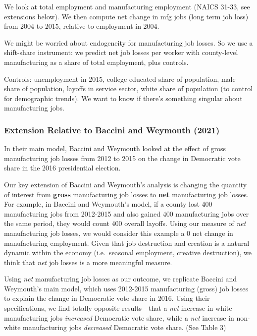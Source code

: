\documentclass[
  12pt,
]{article}
\begin{document}
We look at total employment and manufacturing employment (NAICS 31-33,
see extensions below). We then compute net change in mfg jobs (long term
job loss) from 2004 to 2015, relative to employment in 2004.

We might be worried about endogeneity for manufacturing job losses. So
we use a shift-share instrument: we predict net job losses per worker
with county-level manufacturing as a share of total employment, plus
controls.

Controls: unemployment in 2015, college educated share of population,
male share of population, layoffs in service sector, white share of
population (to control for demographic trends). We want to know if
there's something singular about manufacturing jobs.

\hypertarget{extension-relative-to-baccini-and-weymouth-2021}{%
\subsubsection{Extension Relative to Baccini and Weymouth
(2021)}\label{extension-relative-to-baccini-and-weymouth-2021}}

In their main model, Baccini and Weymouth looked at the effect of gross
manufacturing job losses from 2012 to 2015 on the change in Democratic
vote share in the 2016 presidential election.

Our key extension of Baccini and Weymouth's analysis is changing the
quantity of interest from \textbf{gross} manufacturing job losses to
\textbf{net} manufacturing job losses. For example, in Baccini and
Weymouth's model, if a county lost 400 manufacturing jobs from 2012-2015
and also gained 400 manufacturing jobs over the same period, they would
count 400 overall layoffs. Using our measure of \emph{net} manufacturing
job losses, we would consider this example a 0 net change in
manufacturing employment. Given that job destruction and creation is a
natural dynamic within the economy (i.e.~seasonal employment, creative
destruction), we think that \emph{net} job losses is a more meaningful
measure.

Using \emph{net} manufacturing job losses as our outcome, we replicate
Baccini and Weymouth's main model, which uses 2012-2015 manufacturing
(gross) job losses to explain the change in Democratic vote share in
2016. Using their specifications, we find totally opposite results -
that a \emph{net} increase in white manufacturing jobs \emph{increased}
Democratic vote share, while a \emph{net} increase in non-white
manufacturing jobs \emph{decreased} Democratic vote share. (See Table 3)
\end{document}

